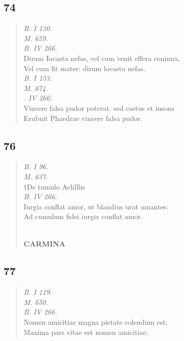 \documentclass[11pt, a4paper]{report}
\begin{document}
            \subsection*{74}
      \begin{verse}
      \textit{B. I 130.} \\ \textit{M. 659.} \\ \textit{B. IV 266.} \\ Dirum Iocasta nefas, vel cum venit effera coniunx, \\ Vel cum fit mater: dirum locasta nefas. \\ \textit{B. I 153.} \\ \textit{M. 674.} \\ \textit{. IV 266.} \\ Vincere falsa pudor poterat. sed castus et insons \\ Erubuit Phaedrae vincere falsa pudor. \\ 
      \end{verse}
  
            \subsection*{76}
      \begin{verse}
      \textit{B. I 96.} \\ \textit{M. 637.} \\ †De tumulo Aehlllis \\ \textit{B. IV 266.} \\ Iurgia conflat amor, ut blandius urat amantes: \\ Ad cumulum fidei iurgia conflat amor. \\ 
        ﻿\pagebreak 
    \begin{center} \textbf{CARMINA} \end{center} \marginpar{[110]} 
      \end{verse}
  
            \subsection*{77}
      \begin{verse}
      \textit{B. I 119.} \\ \textit{M. 650.} \\ \textit{B. IV 266.} \\ Nomen amicitiae magna pietate colendum est; \\ Maxima pars vitae est nomen amicitiae. \\ 
      \end{verse}
  
\end{document}
